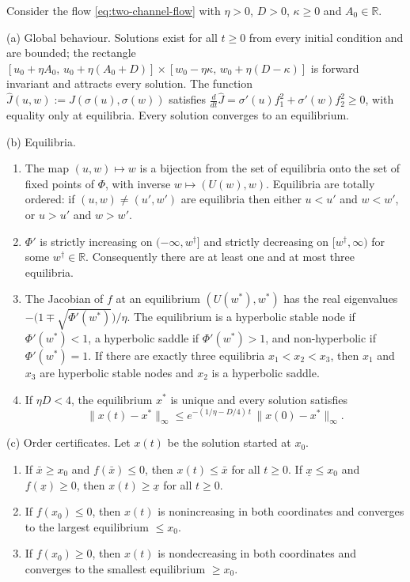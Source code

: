 \begin{theorem}
\label{thm:dynamics-two-channel}
Consider the flow \eqref{eq:two-channel-flow} with $\eta>0$, $D>0$,
$\kappa\ge0$ and $A_0\in\mathbb R$.

\smallskip\noindent\textup{(a) Global behaviour.}
Solutions exist for all $t\ge0$ from every initial condition and are
bounded; the rectangle
$[u_0+\eta A_0,\,u_0+\eta(A_0+D)]\times[w_0-\eta\kappa,\,w_0+\eta(D-\kappa)]$
is forward invariant and attracts every solution. The function
$\hat J(u,w):=J(\sigma(u),\sigma(w))$ satisfies
$\frac{d}{dt}\hat J=\sigma'(u)f_1^2+\sigma'(w)f_2^2\ge0$, with equality
only at equilibria. Every solution converges to an equilibrium.

\smallskip\noindent\textup{(b) Equilibria.}
\begin{enumerate}
\item[\textup{(b1)}] The map $(u,w)\mapsto w$ is a bijection from the set
of equilibria onto the set of fixed points of $\Phi$, with inverse
$w\mapsto(U(w),w)$. Equilibria are totally ordered: if
$(u,w)\ne(u',w')$ are equilibria then either $u<u'$ and $w<w'$, or $u>u'$
and $w>w'$.
\item[\textup{(b2)}] $\Phi'$ is strictly increasing on $(-\infty,w^\dagger]$
and strictly decreasing on $[w^\dagger,\infty)$ for some
$w^\dagger\in\mathbb R$. Consequently there are at least one and at most
three equilibria.
\item[\textup{(b3)}] The Jacobian of $f$ at an equilibrium $(U(w^\ast),w^\ast)$
has the real eigenvalues $-\bigl(1\mp\sqrt{\Phi'(w^\ast)}\bigr)/\eta$. The
equilibrium is a hyperbolic stable node if $\Phi'(w^\ast)<1$, a hyperbolic
saddle if $\Phi'(w^\ast)>1$, and non-hyperbolic if $\Phi'(w^\ast)=1$. If
there are exactly three equilibria $x_1<x_2<x_3$, then $x_1$ and $x_3$ are
hyperbolic stable nodes and $x_2$ is a hyperbolic saddle.
\item[\textup{(b4)}] If $\eta D<4$, the equilibrium $x^\ast$ is unique and
every solution satisfies
\[
\|x(t)-x^\ast\|_\infty\le e^{-(1/\eta-D/4)\,t}\,\|x(0)-x^\ast\|_\infty .
\]
\end{enumerate}

\smallskip\noindent\textup{(c) Order certificates.}
Let $x(t)$ be the solution started at $x_0$.
\begin{enumerate}
\item[\textup{(c1)}] If $\bar x\ge x_0$ and $f(\bar x)\le0$, then
$x(t)\le\bar x$ for all $t\ge0$. If $\underline x\le x_0$ and
$f(\underline x)\ge0$, then $x(t)\ge\underline x$ for all $t\ge0$.
\item[\textup{(c2)}] If $f(x_0)\le0$, then $x(t)$ is nonincreasing in both
coordinates and converges to the largest equilibrium $\le x_0$.
\item[\textup{(c3)}] If $f(x_0)\ge0$, then $x(t)$ is nondecreasing in both
coordinates and converges to the smallest equilibrium $\ge x_0$.
\end{enumerate}


\end{theorem}
